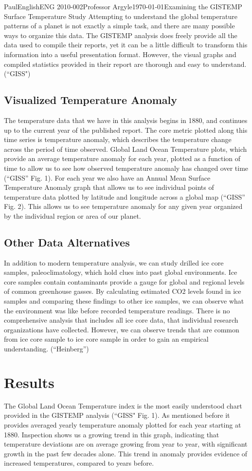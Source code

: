 \documentclass[12pt,letterpaper]{article}
\begin{document}
\begin{mla}{Paul}{English}{ENG 2010-002}{Professor Argyle}{\today}{Examining the GISTEMP Surface Temperature Study}
Attempting to understand the global temperature patterns of a planet is not exactly a simple task, and there are many possible ways to organize this data. The GISTEMP analysis does freely provide all the data used to compile their reports, yet it can be a little difficult to transform this information into a useful presentation format. However, the visual graphs and compiled statistics provided in their report are thorough and easy to understand. (``GISS")

\subsection{Visualized Temperature Anomaly}
The temperature data that we have in this analysis begins in 1880, and continues up to the current year of the published report. The core metric plotted along this time series is temperature anomaly, which describes the temperature change across the period of time observed. Global Land Ocean Temperature plots, which provide an average temperature anomaly for each year, plotted as a function of time to allow us to see how observed temperature anomaly has changed over time (``GISS'' Fig. 1). For each year we also have an Annual Mean Surface Temperature Anomaly graph that allows us to see individual points of temperature data plotted by latitude and longitude across a global map (``GISS'' Fig. 2). This allows us to see temperature anomaly for any given year organized by the individual region or area of our planet.

\subsection{Other Data Alternatives}
In addition to modern temperature analysis, we can study drilled ice core samples, paleoclimatology, which hold clues into past global environments. Ice core samples contain contaminants provide a gauge for global and regional levels of common greenhouse gasses. By calculating estimated CO2 levels found in ice samples and comparing these findings to other ice samples, we can observe what the environment was like before recorded temperature readings. There is no comprehensive analysis that includes all ice core data, that individual research organizations have collected. However, we can observe trends that are common from ice core sample to ice core sample in order to gain an empirical understanding. (``Heinberg'')

\section{Results}
The Global Land Ocean Temperature index is the most easily understood chart provided in the GISTEMP analysis (``GISS" Fig. 1). As mentioned before it provides averaged yearly  temperature anomaly plotted for each year starting at 1880. Inspection shows us a growing trend in this graph, indicating that temperature deviations are on average growing from year to year, with significant growth in the past few decades alone. This trend in anomaly provides evidence of increased temperatures, compared to years before.


\end{mla}
\end{document}
